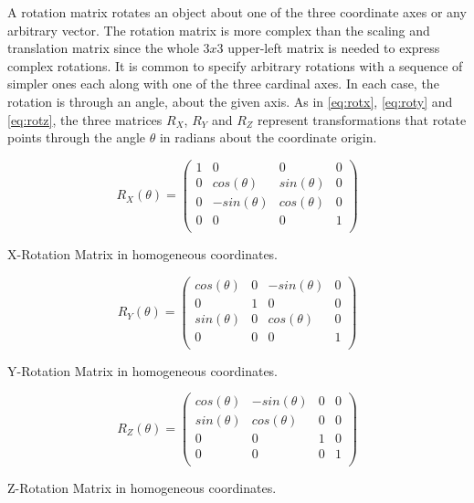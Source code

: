 \noindent A rotation matrix rotates an object about one of the three coordinate axes or any arbitrary vector. The rotation matrix is more complex than the scaling and translation matrix since the whole $3x3$ upper-left matrix is needed to express complex rotations. It is common to specify arbitrary rotations with a sequence of simpler ones each along with one of the three cardinal axes. In each case, the rotation is through an angle, about the given axis. As in \ref{eq:rotx}, \ref{eq:roty} and \ref{eq:rotz}, the three matrices $R_X$, $R_Y$ and $R_Z$ represent transformations that rotate points through the angle $\theta$ in radians about the coordinate origin.

\begin{Equation}[!htb]
	\centering
	\begin{equation} \label{eq:rotx}
	R_X(\theta) =
		\begin{pmatrix}
			1 & 0 & 0 & 0 \\
			0 & cos(\theta) & sin(\theta) & 0 \\
			0 & -sin(\theta) & cos(\theta) & 0 \\
			0 & 0 & 0 & 1 \\
		\end{pmatrix}
	\end{equation}
	\caption[X-Rotation Matrix in homogeneous coordinates.]{X-Rotation Matrix in homogeneous coordinates.}
\end{Equation}

\begin{Equation}[!htb]
	\centering
	\begin{equation} \label{eq:roty}
	R_Y(\theta) =
		\begin{pmatrix}
			cos(\theta) & 0 & -sin(\theta) & 0 \\
			0 & 1 & 0 & 0 \\
			sin(\theta) & 0 & cos(\theta) & 0 \\
			0 & 0 & 0 & 1 \\
		\end{pmatrix}
	\end{equation}
	\caption[Y-Rotation Matrix in homogeneous coordinates.]{Y-Rotation Matrix in homogeneous coordinates.}
\end{Equation}

\begin{Equation}[!htb]
	\centering
	\begin{equation} \label{eq:rotz}
	R_Z(\theta) =
		\begin{pmatrix}
			cos(\theta) & -sin(\theta) & 0 & 0 \\
			sin(\theta) & cos(\theta) & 0 & 0 \\
			0 & 0 & 1 & 0 \\
			0 & 0 & 0 & 1 \\
		\end{pmatrix}
	\end{equation}
	\caption[Z-Rotation Matrix in homogeneous coordinates.]{Z-Rotation Matrix in homogeneous coordinates.}
\end{Equation} 

